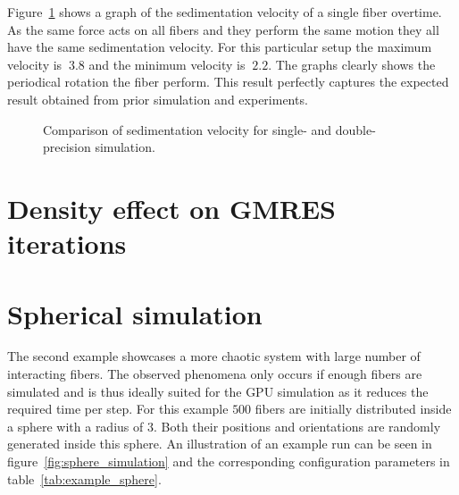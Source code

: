 \documentclass[a4paper,11pt]{kth-mag}
\begin{document}
Figure~\ref{fig:ring_sedimentation_velocity} shows a graph of the sedimentation velocity of a single fiber overtime. As the same force acts on all fibers and they perform the same motion they all have the same sedimentation velocity. For this particular setup the maximum velocity is $~3.8$ and the minimum velocity is $~2.2$. The graphs clearly shows the periodical rotation the fiber perform. This result perfectly captures the expected result obtained from prior simulation and experiments.


\begin{figure}[!htbp]
  \centering
  \caption{Comparison of sedimentation velocity for single- and double-precision simulation.}
  \label{fig:ring_sedimentation_velocity}
\end{figure}

\section{Density effect on GMRES iterations}

\section{Spherical simulation}
\label{sec:example_sphere}

The second example showcases a more chaotic system with large number of interacting fibers. The observed phenomena only occurs if enough fibers are simulated and is thus ideally suited for the GPU simulation as it reduces the required time per step. For this example $500$ fibers are initially distributed inside a sphere with a radius of $3$. Both their positions and orientations are randomly generated inside this sphere. An illustration of an example run can be seen in figure~\ref{fig:sphere_simulation} and the corresponding configuration parameters in table~\ref{tab:example_sphere}.
\end{document}
